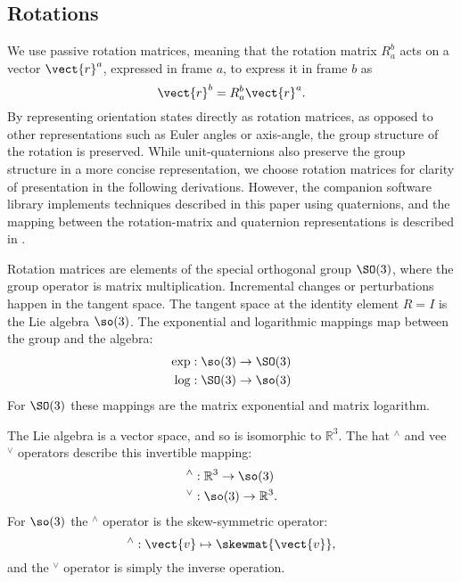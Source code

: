 
\subsection{Rotations}

We use passive rotation matrices, meaning that the rotation matrix $R_a^b$ acts on a vector $\vect{r}^a$, expressed in frame $a$, to express it in frame $b$ as
\begin{equation}
\vect{r}^b = R_a^b \vect{r}^a .
\end{equation}
By representing orientation states directly as rotation matrices, as opposed to other representations such as Euler angles or axis-angle, the group structure of the rotation is preserved.
While unit-quaternions also preserve the group structure in a more concise representation, we choose rotation matrices for clarity of presentation in the following derivations.
However, the companion software library implements techniques described in this paper using quaternions, and the mapping between the rotation-matrix and quaternion representations is described in .

Rotation matrices are elements of the special orthogonal group $\SO(3)$, where the group operator is matrix multiplication.
Incremental changes or perturbations happen in the tangent space.
The tangent space at the identity element $R=I$ is the Lie algebra $\so(3)$.
The exponential and logarithmic mappings map between the group and the algebra:
\begin{align}
\exp &: \so(3) \to \SO(3) \\
\log &: \SO(3) \to \so(3)
\end{align}
For $\SO(3)$ these mappings are the matrix exponential and matrix logarithm.

The Lie algebra is a vector space, and so is isomorphic to $\mathbb{R}^3$.
The hat $^\wedge$ and vee $^\vee$ operators describe this invertible mapping:
\begin{align}
^\wedge &: \mathbb{R}^3 \to \so(3) \\
^\vee &: \so(3) \to \mathbb{R}^3 .
\end{align}
For $\so(3)$ the $^\wedge$ operator is the skew-symmetric operator:
\begin{equation}
^\wedge : \vect{v} \mapsto \skewmat{\vect{v}} ,
\end{equation}
and the $^\vee$ operator is simply the inverse operation.

